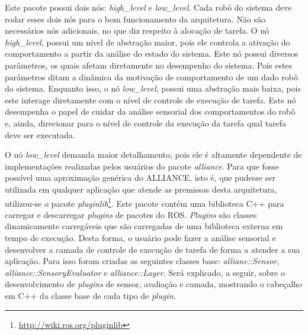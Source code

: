         Este pacote possui dois nós: \textit{high\_level} e \textit{low\_level}. Cada robô do sistema deve rodar esses dois nós para o bom funcionamento da arquitetura. Não são necessários nós adicionais, no que diz respeito à alocação de tarefa. O nó \textit{high\_level}, possui um nível de abstração maior, pois ele controla a ativação do comportamento a partir da análise do estado do sistema. Este nó possui diversos parâmetros, os quais afetam diretamente no desempenho do sistema. Pois estes parâmetros ditam a dinâmica da motivação de comportamento de um dado robô do sistema. Enquanto isso, o nó \textit{low\_level}, possui uma abstração mais baixa, pois este interage diretamente com o nível de controle de execução de tarefa. Este nó desempenha o papel de cuidar da análise sensorial dos comportamentos do robô e, ainda, direcionar para o nível de controle da execução da tarefa qual tarefa deve ser executada.
        
        O nó \textit{low\_level} demanda maior detalhamento, pois ele é altamente dependente de implementações realizadas pelos usuários do pacote \textit{alliance}. Para que fosse possível uma aproximação genérica do ALLIANCE, isto é, que pudesse ser utilizada em qualquer aplicação que atende as premissas desta arquitetura, utilizou-se o pacote \textit{pluginlib}\footnote{\url{http://wiki.ros.org/pluginlib}}. Este pacote contém uma biblioteca C++ para carregar e descarregar \textit{plugins} de pacotes do ROS. \textit{Plugins} são classes dinamicamente carregáveis que são carregadas de uma biblioteca externa em tempo de execução. Desta forma, o usuário pode fazer a análise sensorial e desenvolver a camada de controle de execução de tarefa de forma a atender a sua aplicação. Para isso foram criadas as seguintes classes base: \textit{alliane::Sensor}, \textit{alliance::SensoryEvaluator} e \textit{alliance::Layer}. Será explicado, a seguir, sobre o desenvolvimento de \textit{plugins} de sensor, avaliação e camada, mostrando o cabeçalho em C++ da classe base de cada tipo de \textit{plugin}.
        
        
